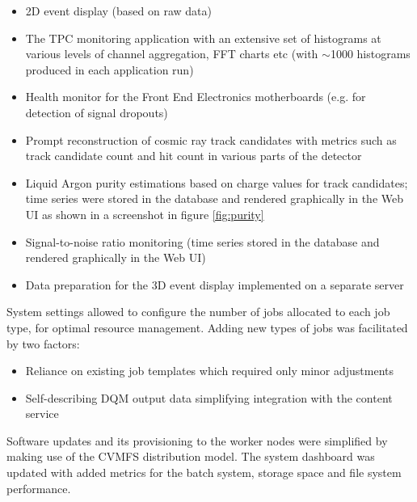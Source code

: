 \documentclass{webofc}
\begin{document}
\begin{itemize}

\item 2D event display (based on raw data)

\item The TPC monitoring application with an extensive set of histograms at various
levels of channel aggregation, FFT charts etc (with $\sim$1000 histograms produced
in each application run)

\item Health monitor for the Front End Electronics motherboards (e.g. for detection of
signal dropouts)

\item Prompt reconstruction of cosmic ray track candidates with metrics such as
track candidate count and hit count in various parts of the detector

\item Liquid Argon purity estimations based on charge values for track candidates;
time series were stored in the database and rendered graphically in the Web UI as shown in
a screenshot in figure \ref{fig:purity}

\item Signal-to-noise ratio monitoring (time series stored in the database and rendered graphically in the Web UI)

\item Data preparation for the 3D event display implemented on a separate server

\end{itemize}

\noindent System settings allowed to configure the number of jobs allocated to each job type,
for optimal resource management. Adding new types of jobs was facilitated by two factors:

\begin{itemize}

\item Reliance on existing job templates which required only minor adjustments

\item Self-describing DQM output data simplifying integration with the content service \cite{chep18}

\end{itemize}

\noindent Software updates and its provisioning to the worker nodes were simplified by making use of
the CVMFS distribution model.
The system dashboard was updated with added metrics for the
batch system, storage space and file system performance.
\end{document}
